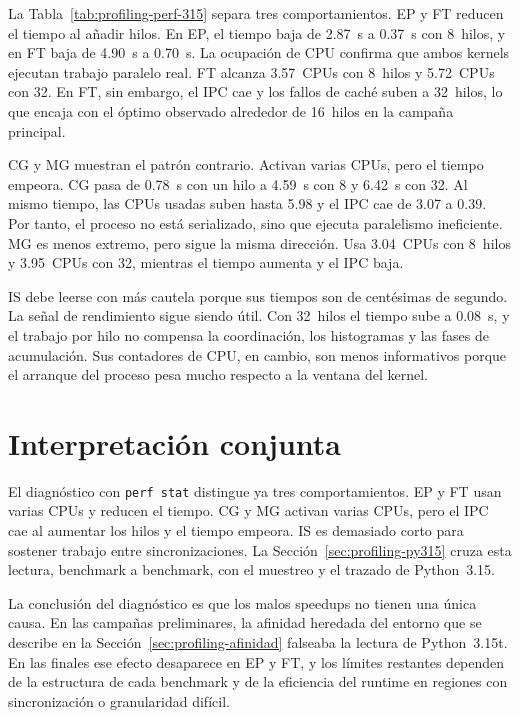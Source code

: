 

La Tabla~\ref{tab:profiling-perf-315} separa tres comportamientos. EP y FT
reducen el tiempo al añadir hilos. En EP, el tiempo baja de 2.87~s a 0.37~s con
8~hilos, y en FT baja de 4.90~s a 0.70~s. La ocupación de CPU confirma que ambos
kernels ejecutan trabajo paralelo real. FT alcanza 3.57~CPUs con 8~hilos y
5.72~CPUs con 32. En FT, sin embargo, el IPC cae y los fallos de caché suben a
32~hilos, lo que encaja con el óptimo observado alrededor de 16~hilos en la
campaña principal.

CG y MG muestran el patrón contrario. Activan varias CPUs, pero el tiempo
empeora. CG pasa de 0.78~s con un hilo a 4.59~s con 8 y 6.42~s con 32. Al mismo
tiempo, las CPUs usadas suben hasta 5.98 y el IPC cae de 3.07 a 0.39. Por tanto,
el proceso no está serializado, sino que ejecuta paralelismo ineficiente. MG es
menos extremo, pero sigue la misma dirección. Usa 3.04~CPUs con 8~hilos y
3.95~CPUs con 32, mientras el tiempo aumenta y el IPC baja.

IS debe leerse con más cautela porque sus tiempos son de centésimas de segundo.
La señal de rendimiento sigue siendo útil. Con 32~hilos el tiempo sube a
0.08~s, y el trabajo por hilo no compensa la coordinación, los histogramas y las
fases de acumulación. Sus contadores de CPU, en cambio, son menos informativos
porque el arranque del proceso pesa mucho respecto a la ventana del kernel.


\section{Interpretación conjunta}
\label{sec:profiling-interpretacion}

El diagnóstico con \texttt{perf stat} distingue ya tres comportamientos. EP y FT
usan varias CPUs y reducen el tiempo. CG y MG activan varias CPUs, pero el IPC
cae al aumentar los hilos y el tiempo empeora. IS es demasiado corto para
sostener trabajo entre sincronizaciones. La Sección~\ref{sec:profiling-py315}
cruza esta lectura, benchmark a benchmark, con el muestreo y el trazado de
Python~3.15.

La conclusión del diagnóstico es que los malos speedups no tienen una única
causa. En las campañas preliminares, la afinidad heredada del entorno que se
describe en la Sección~\ref{sec:profiling-afinidad} falseaba la lectura de
Python~3.15t. En las finales ese efecto desaparece en EP y FT, y los límites
restantes dependen de la estructura de cada benchmark y de la eficiencia del
runtime en regiones con sincronización o granularidad difícil.


